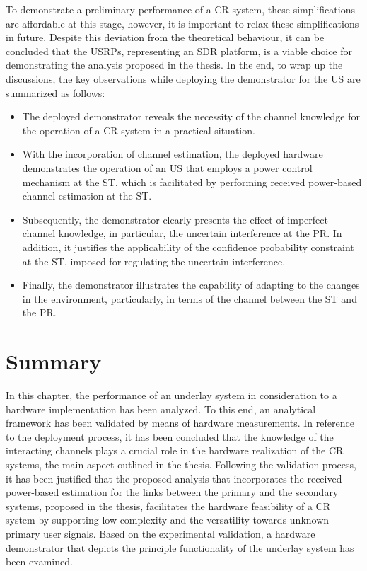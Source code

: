 To demonstrate a preliminary performance of a CR system, these simplifications are affordable at this stage, however, it is important to relax these simplifications in future. 
Despite this deviation from the theoretical behaviour, it can be concluded that the USRPs, representing an SDR platform, is a viable choice for demonstrating the analysis proposed in the thesis. 
In the end, to wrap up the discussions, the key observations while deploying the demonstrator for the US are summarized as follows: \begin{itemize} \item The deployed demonstrator reveals the necessity of the channel knowledge for the operation of a CR system in a practical situation. \item With the incorporation of channel estimation, the deployed hardware demonstrates the operation of an US that employs a power control mechanism at the ST, which is facilitated by performing received power-based channel estimation at the ST. \item Subsequently, the demonstrator clearly presents the effect of imperfect channel knowledge, in particular, the uncertain interference at the PR. In addition, it justifies the applicability of the confidence probability constraint at the ST, imposed for regulating the uncertain interference. 
\item Finally, the demonstrator illustrates the capability of adapting to the changes in the environment, particularly, in terms of the channel between the ST and the PR.  \end{itemize}

\section{Summary}
\label{con}

In this chapter, the performance of an underlay system in consideration to a hardware implementation has been analyzed. To this end, an analytical framework has been validated by means of hardware measurements. 
In reference to the deployment process, it has been concluded that the knowledge of the interacting channels plays a crucial role in the hardware realization of the CR systems, the main aspect outlined in the thesis. Following the validation process, it has been justified that the proposed analysis that incorporates the received power-based estimation for the links between the primary and the secondary systems, proposed in the thesis, facilitates the hardware feasibility of a CR system by supporting low complexity and the versatility towards unknown primary user signals. Based on the experimental validation, a hardware demonstrator that depicts the principle functionality of the underlay system has been examined. 

